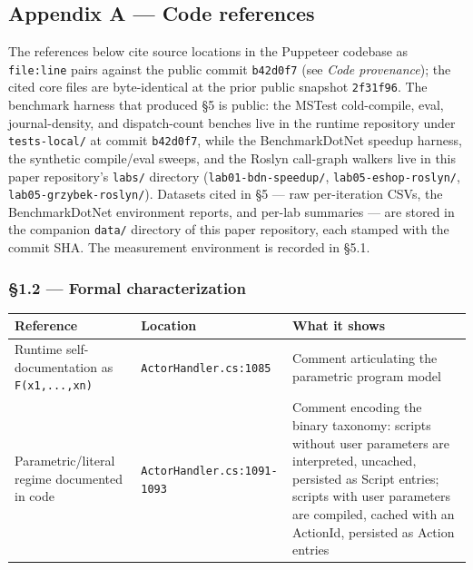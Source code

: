 \documentclass[
]{article}
\newcounter{none} %
\let\origtexttt\texttt%
\renewcommand{\texttt}[1]{\origtexttt{\seqsplit{#1}}}%
\let\texttt\origtexttt%
\begin{document}
\subsection{Appendix A --- Code
references}\label{appendix-a-code-references}

The references below cite source locations in the Puppeteer codebase as
\texttt{file:line} pairs against the public commit \texttt{b42d0f7} (see
\emph{Code provenance}); the cited core files are byte-identical at the
prior public snapshot \texttt{2f31f96}. The benchmark harness that
produced §5 is public: the MSTest cold-compile, eval, journal-density,
and dispatch-count benches live in the runtime repository under
\texttt{tests-local/} at commit \texttt{b42d0f7}, while the
BenchmarkDotNet speedup harness, the synthetic compile/eval sweeps, and
the Roslyn call-graph walkers live in this paper repository's
\texttt{labs/} directory (\texttt{lab01-bdn-speedup/},
\texttt{lab05-eshop-roslyn/}, \texttt{lab05-grzybek-roslyn/}). Datasets
cited in §5 --- raw per-iteration CSVs, the BenchmarkDotNet environment
reports, and per-lab summaries --- are stored in the companion
\texttt{data/} directory of this paper repository, each stamped with the
commit SHA. The measurement environment is recorded in §5.1.

\subsubsection{§1.2 --- Formal
characterization}\label{formal-characterization}

{\def\LTcaptype{none} %
\begin{longtable}[]{@{}
  >{\raggedright\arraybackslash}p{}
  >{\raggedright\arraybackslash}p{}
  >{\raggedright\arraybackslash}p{}@{}}
\toprule\noalign{}
\begin{minipage}[b]{\linewidth}\raggedright
Reference
\end{minipage} & \begin{minipage}[b]{\linewidth}\raggedright
Location
\end{minipage} & \begin{minipage}[b]{\linewidth}\raggedright
What it shows
\end{minipage} \\
\midrule\noalign{}
\endhead
\bottomrule\noalign{}
\endlastfoot
Runtime self-documentation as \texttt{F(x1,...,xn)} &
\texttt{ActorHandler.cs:1085} & Comment articulating the parametric
program model \\
Parametric/literal regime documented in code &
\texttt{ActorHandler.cs:1091-1093} & Comment encoding the binary
taxonomy: scripts without user parameters are interpreted, uncached,
persisted as Script entries; scripts with user parameters are compiled,
cached with an ActionId, persisted as Action entries \\
\end{longtable}
}
\end{document}
